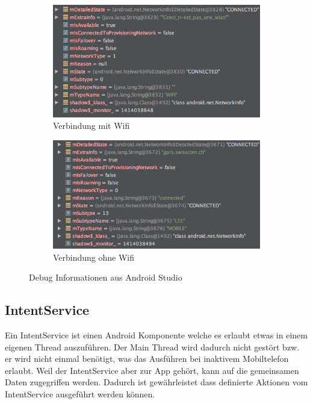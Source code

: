 \begin{figure}[ht]
\centering
\begin{subfigure}[b]{0.8\textwidth}
  \centering
  \includegraphics[width=1\linewidth]{images/debugwifi.png}
  \caption{Verbindung mit Wifi}
  \label{fig:sub1}
\end{subfigure}

\begin{subfigure}[b]{0.8\textwidth}
  \centering
  \includegraphics[width=1\linewidth]{images/debugnowifi.png}
  \caption{Verbindung ohne Wifi}
  \label{fig:sub2}
\end{subfigure}
\caption{Debug Informationen aus Android Studio}
\label{fig:verbindungsinfo}
\end{figure}


\subsection{IntentService}
Ein IntentService ist einen Android Komponente welche es erlaubt etwas in einem eigenen Thread auszuführen. Der Main Thread wird dadurch nicht gestört bzw. er wird nicht einmal benötigt, was das Ausführen bei inaktivem Mobiltelefon erlaubt. Weil der IntentService aber zur App gehört, kann auf die gemeinsamen Daten zugegriffen werden. Dadurch ist gewährleistet dass definierte Aktionen vom IntentService ausgeführt werden können.

